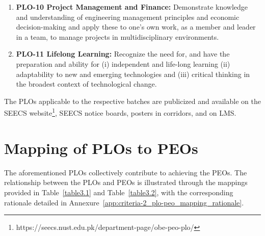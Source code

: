 \begin{enumerate}
\item \textbf{PLO-10 Project Management and Finance:} Demonstrate knowledge and understanding of engineering management principles and economic decision-making and apply these to one's own work, as a member and leader in a team, to manage projects in multidisciplinary environments.
\item \textbf{PLO-11 Lifelong Learning:} Recognize the need for, and have the preparation and ability for (i) independent and life-long learning (ii) adaptability to new and emerging technologies and (iii) critical thinking in the broadest context of technological change.
\end{enumerate}

The PLOs applicable to the respective batches are publicized and available on the SEECS website\footnote{https://seecs.nust.edu.pk/department-page/obe-peo-plo/}, SEECS notice boards, posters in corridors, and on LMS.

\hypertarget{sec:plopeo}{%
\section{Mapping of PLOs to PEOs}\label{sec:plopeo}}

The aforementioned PLOs collectively contribute to achieving the PEOs. The relationship between the PLOs and PEOs is illustrated through the mappings provided in Table~\ref{table3.1} and Table~\ref{table3.2}, with the corresponding rationale detailed in Annexure~\ref{app:criteria-2_plo-peo_mapping_rationale}.

